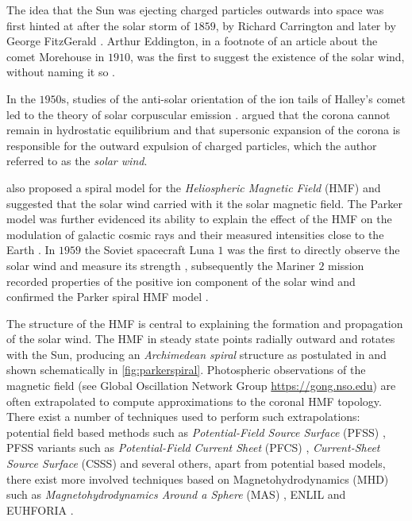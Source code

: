The idea that the Sun was ejecting charged particles outwards into space was first hinted at after 
the solar storm of $1859$, by Richard Carrington \citep{cliver20131859} and later by George 
FitzGerald \citep{meyer2007basics}. Arthur Eddington, in a footnote of an article about the comet 
Morehouse in $1910$, was the first to suggest the existence of the solar wind, without naming it so 
\citep{eddingtonFootnote}.

In the $1950\text{s}$, studies of the anti-solar orientation of the ion tails of Halley's comet 
led to the theory of solar corpuscular emission \citep{Bierman1,Bierman2,Bierman3}. 
\citet{parker1958dynamics,Parker1960,Parker1965} argued that the corona cannot remain in 
hydrostatic equilibrium and that supersonic expansion of the corona is responsible for the 
outward expulsion of charged particles, which the author referred to as the \emph{solar wind}.

\citet{parker1958dynamics} also proposed a spiral model for the \emph{Heliospheric Magnetic Field} 
(HMF) and suggested that the solar wind carried with it the solar magnetic field. The Parker model 
was further evidenced its ability to explain the effect of the HMF on the modulation of galactic 
cosmic rays and their measured intensities close to the Earth \citep{ParkerSolarWind}. In $1959$ 
the Soviet spacecraft Luna $1$ was the first to directly observe the solar wind and measure its 
strength \citep{harvey2007russian}, subsequently the Mariner $2$ mission recorded properties of the 
positive ion component of the solar wind and confirmed the Parker spiral HMF model 
\citep{neugebauer1966mariner}.

The structure of the HMF is central to explaining the formation and propagation of the solar wind. 
The HMF in steady state points radially outward and rotates with the Sun, producing an 
\emph{Archimedean spiral} structure as postulated in \cite{parker1958dynamics} and shown schematically in \cref{fig:parkerspiral}. Photospheric observations of the magnetic field (see 
Global Oscillation Network Group \url{https://gong.nso.edu}) are often extrapolated to compute 
approximations to the coronal HMF topology. There exist a number of techniques used to perform such 
extrapolations: potential field based methods such as \emph{Potential-Field Source Surface} (PFSS) 
\citep{schatten1969model,altschuler1969magnetic}, PFSS variants such as 
\emph{Potential-Field Current Sheet} (PFCS) \citep{schatten1971current}, 
\emph{Current-Sheet Source Surface} (CSSS) \citep{csss} and several others, apart from potential 
based models, there exist more involved techniques based on Magnetohydrodynamics (MHD) such as 
\emph{Magnetohydrodynamics Around a Sphere} (MAS) \citep{linker1999magnetohydrodynamic}, 
ENLIL \citep{ODSTRCIL1996,ODSTRCIL1999a,ODSTRCIL1999b,ODSTRCIL2003,ODSTRCIL2004} and EUHFORIA 
\citep{pomoell2018euhforia}. 

